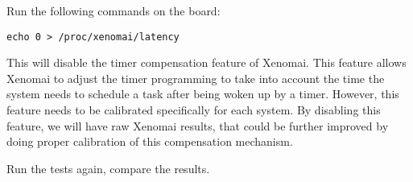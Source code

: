 Run the following commands on the board:

\begin{verbatim}
echo 0 > /proc/xenomai/latency
\end{verbatim}

This will disable the timer compensation feature of Xenomai. This
feature allows Xenomai to adjust the timer programming to take into
account the time the system needs to schedule a task after being woken
up by a timer. However, this feature needs to be calibrated
specifically for each system. By disabling this feature, we will have
raw Xenomai results, that could be further improved by doing proper
calibration of this compensation mechanism.

Run the tests again, compare the results.

